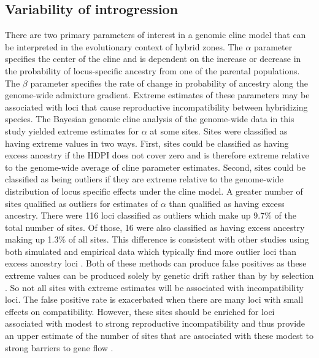 \subsection{Variability of introgression}
There are two primary parameters of interest in a genomic cline model that 
can be interpreted in the evolutionary context of hybrid zones.
The $\alpha$ parameter specifies the center of the cline and is dependent on the 
increase or decrease in the probability of locus-specific ancestry from one of 
the parental populations.  
The $\beta$ parameter specifies the rate of change in probability of ancestry 
along the genome-wide admixture gradient.  
Extreme estimates of these parameters may be associated with loci that cause  
reproductive incompatibility between hybridizing species. 
The Bayesian genomic cline analysis of the genome-wide data in this study yielded extreme 
estimates for $\alpha$ at some sites.
Sites were classified as having extreme values in two ways. 
First, sites could be classified as having excess ancestry if the HDPI does not cover
zero and is therefore extreme relative to the genome-wide average of cline 
parameter estimates.
Second, sites could be classified as being outliers if they are extreme relative  
to the genome-wide distribution of locus specific effects under the cline model.
A greater number of sites qualified as outliers for estimates of $\alpha$ than 
qualified as having excess ancestry.
There were 116 loci classified as outliers which make up 9.7\% of the total 
number of sites.
Of those, 16 were also classified as having excess ancestry making up 1.3\% of all sites.
This difference is consistent with other studies using both simulated and 
empirical data which typically find more outlier loci than excess ancestry loci \parencite{gompert2012,}. 
Both of these methods can produce false positives as these extreme values can
be produced solely by genetic drift rather than by by selection \parencite{gompert2012}. 
So not all sites with extreme estimates will be associated with incompatibility loci. 
The false positive rate is exacerbated when there are many loci with small 
effects on compatibility. 
However, these sites should be enriched for loci associated with modest to strong 
reproductive incompatibility and thus provide an upper estimate of the number of 
sites that are associated with these modest to strong barriers to gene flow \parencite{gompert2012}. 

